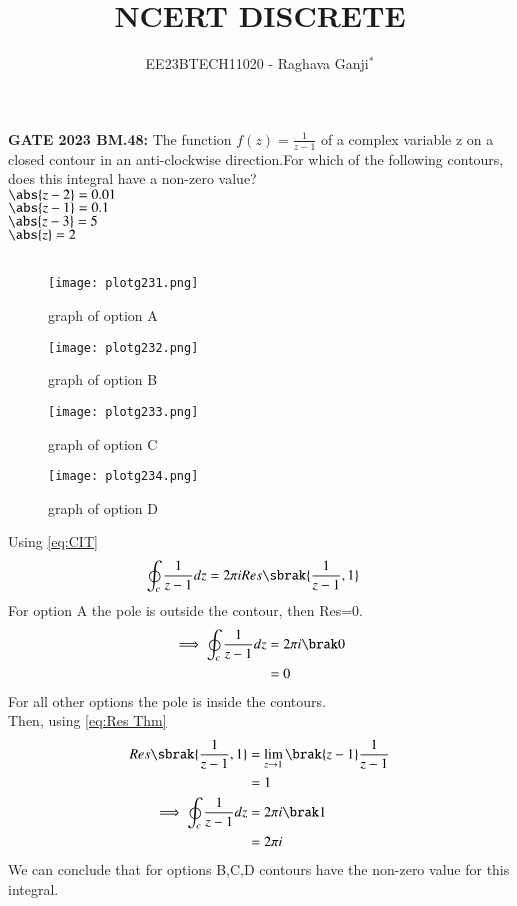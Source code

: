 \documentclass[journal,12pt,twocolumn]{IEEEtran}
\theoremstyle{remark}
\begin{document}

\vspace{3cm}

\title{NCERT DISCRETE}
\author{EE23BTECH11020 - Raghava Ganji$^{*}$%
}
\maketitle
\newpage
\bigskip

\renewcommand{\thefigure}{\theenumi}
\renewcommand{\thetable}{\theenumi}

\textbf{GATE 2023 BM.48:}
The function $f(z)=\frac{1}{z-1}$ of a complex variable z on a closed contour in an anti-clockwise direction.For which of the following contours, does this integral have a non-zero value?\\
$\abs{z-2}=0.01$\\
$\abs{z-1}=0.1$\\
$\abs{z-3}=5$\\
$\abs{z}=2$\\
\solution\\
\begin{figure}
    \centering
    \texttt{[image: plotg231.png]}
    \caption{graph of option A}
\end{figure}
\begin{figure}
    \centering
    \texttt{[image: plotg232.png]}
    \caption{graph of option B}
\end{figure}
\begin{figure}
    \centering
    \texttt{[image: plotg233.png]}
    \caption{graph of option C}
\end{figure}
\begin{figure}
    \centering
    \texttt{[image: plotg234.png]}
    \caption{graph of option D}
\end{figure}
Using \eqref{eq:CIT}
\begin{align}
\oint_{c}\frac{1}{z-1}dz &=2\pi iRes\sbrak{\frac{1}{z-1},1}
\end{align}
For option A the pole is outside the contour, then Res=0.\\
\begin{align}
\implies \oint_{c}\frac{1}{z-1}dz&=2\pi i\brak 0\\
\notag &=0
\end{align}
For all other options the pole is inside the contours.\\
Then, using \eqref{eq:Res Thm}
\begin{align}
Res\sbrak{\frac{1}{z-1},1} &=\lim_{z\to 1}\brak{z-1}\frac{1}{z-1}\\
\notag &=1\\
\implies \oint_{c}\frac{1}{z-1}dz&=2\pi i\brak 1\\
\notag &=2\pi i
\end{align}
We can conclude that for options B,C,D contours have the non-zero value for this integral.
\end{document}
